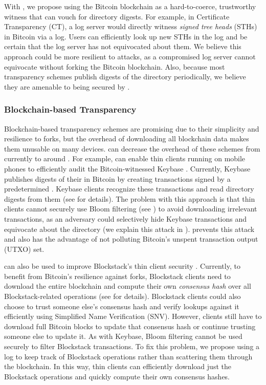 With \Sys, we propose using the Bitcoin blockchain as a hard-to-coerce, trustworthy witness that can vouch for directory digests.
For example, in Certificate Transparency (CT), a log server would directly witness \emph{signed tree heads} (STHs) in Bitcoin via a \Sys log.
Users can efficiently look up new STHs in the \Sys log and be certain that the log server has not equivocated about them.
We believe this approach could be more resilient to attacks, as a compromised log server cannot equivocate without forking the Bitcoin blockchain.
Also, because most transparency schemes publish digests of the directory periodically, we believe they are amenable to being secured by \Sys.

\subsubsection{Blockchain-based Transparency}
\label{sec:background:motivation:blockchain-transparency}
Blockchain-based transparency schemes\cite{keybase,blockstack} are promising due to their simplicity and resilience to forks, but the overhead of downloading all blockchain data makes them unusable on many devices.
\Sys can decrease the overhead of these schemes from currently \blockchainsize\cite{bitcoin-size} to around \headerssize.
For example, \Sys can enable thin clients running on mobile phones to efficiently audit the Bitcoin-witnessed Keybase \pkd\cite{keybase}.
Currently, Keybase publishes digests of their \pkd in Bitcoin by creating transactions signed by a predetermined \pk\cite{keybase-scheme}.
Keybase clients recognize these transactions and read directory digests from them (see  for details).
The problem with this approach is that thin clients cannot securely use Bloom filtering (see ) to avoid downloading irrelevant transactions, as an adversary could selectively hide Keybase transactions and equivocate about the directory (we explain this attack in ).
\Sys prevents this attack and also has the advantage of not polluting Bitcoin's unspent transaction output (UTXO) set\cite{keybase-opret}.

\Sys can also be used to improve Blockstack's thin client security \cite{blockstack}.
Currently, to benefit from Bitcoin's resilience against forks, Blockstack clients need to download the entire blockchain and compute their own \emph{consensus hash} over all Blockstack-related operations (see  for details).
Blockstack clients could also choose to trust someone else's consensus hash and verify \pk lookups against it efficiently using Simplified Name Verification (SNV)\cite{blockstack}.
However, clients still have to download full Bitcoin blocks to update that consensus hash or continue trusting someone else to update it.
As with Keybase, Bloom filtering cannot be used securely to filter Blockstack transactions.
To fix this problem, we propose using a \Sys log to keep track of Blockstack operations rather than scattering them through the blockchain.
In this way, thin clients can efficiently download just the Blockstack operations and quickly compute their own consensus hashes.

